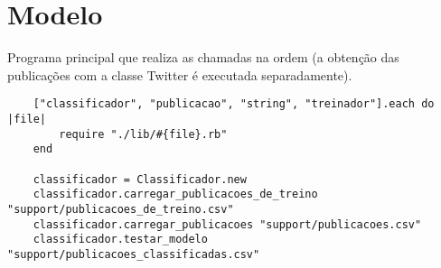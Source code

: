 \section{Modelo}

Programa principal que realiza as chamadas na ordem (a obtenção das publicações com a classe Twitter é executada separadamente).

\begin{lstlisting}
	["classificador", "publicacao", "string", "treinador"].each do |file|
		require "./lib/#{file}.rb"
	end

	classificador = Classificador.new
	classificador.carregar_publicacoes_de_treino "support/publicacoes_de_treino.csv"
	classificador.carregar_publicacoes "support/publicacoes.csv"
	classificador.testar_modelo "support/publicacoes_classificadas.csv"
\end{lstlisting}